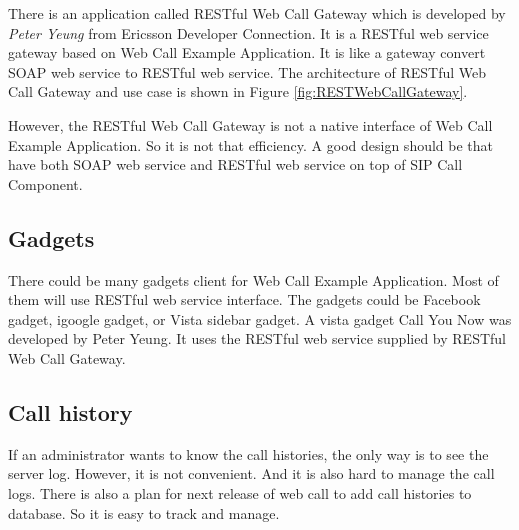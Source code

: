 There is an application called \textsf{RESTful Web Call Gateway} which is developed by \textit{Peter Yeung} from Ericsson Developer Connection. It is a RESTful web service gateway based on Web Call Example Application. It is like a gateway convert SOAP web service to RESTful web service. The architecture of RESTful Web Call Gateway and use case is shown in Figure \ref{fig:RESTWebCallGateway}.

However, the RESTful Web Call Gateway is not a native interface of Web Call Example Application. So it is not that efficiency. A good design should be that have both SOAP web service and RESTful web service on top of SIP Call Component.

\begin{sidewaysfigure}[!hbtp]
\centering
{}
\caption{REST web call gateway (Figure taken from \textit{Using REST and Web Services to Mash Up Communications Capabilities} by Elena Fersman and Peter Yeung \cite{DemoAtJavaOne})}
\label{fig:RESTWebCallGateway}
\end{sidewaysfigure}

\subsection{Gadgets}
\label{sec:Conclusion:FutureWork:Gadgets}

There could be many gadgets client for Web Call Example Application. Most of them will use RESTful web service interface. The gadgets could be Facebook gadget, igoogle gadget, or Vista sidebar gadget. A vista gadget \textsf{Call You Now} was developed by Peter Yeung. It uses the RESTful web service supplied by RESTful Web Call Gateway.

\subsection{Call history}
\label{sec:Conclusion:FutureWork:CallHistory}

If an administrator wants to know the call histories, the only way is to see the server log. However, it is not convenient. And it is also hard to manage the call logs. There is also a plan for next release of web call to add call histories to database. So it is easy to track and manage.

